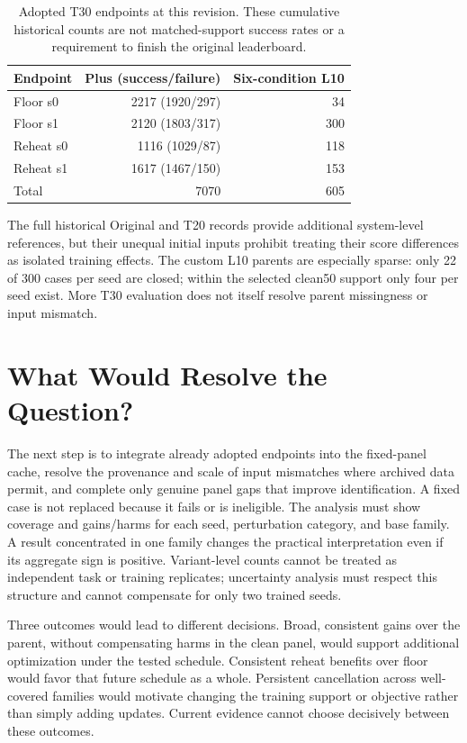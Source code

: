 \documentclass[conference]{IEEEtran}
\begin{document}
\begin{table}[t]
\caption{Adopted T30 endpoints at this revision. These cumulative historical counts are not matched-support success rates or a requirement to finish the original leaderboard.}
\label{tab:coverage}\centering
\begin{tabular}{@{}lrr@{}}
\toprule
Endpoint & Plus (success/failure) & Six-condition L10\\
\midrule
Floor s0 &2217 (1920/297)&34\\
Floor s1 &2120 (1803/317)&300\\
Reheat s0 &1116 (1029/87)&118\\
Reheat s1 &1617 (1467/150)&153\\
\midrule
Total &7070&605\\
\bottomrule
\end{tabular}
\end{table}

The full historical Original and T20 records provide additional system-level references, but their unequal initial inputs prohibit treating their score differences as isolated training effects. The custom L10 parents are especially sparse: only 22 of 300 cases per seed are closed; within the selected clean50 support only four per seed exist. More T30 evaluation does not itself resolve parent missingness or input mismatch.

\section{What Would Resolve the Question?}
The next step is to integrate already adopted endpoints into the fixed-panel cache, resolve the provenance and scale of input mismatches where archived data permit, and complete only genuine panel gaps that improve identification. A fixed case is not replaced because it fails or is ineligible. The analysis must show coverage and gains/harms for each seed, perturbation category, and base family. A result concentrated in one family changes the practical interpretation even if its aggregate sign is positive. Variant-level counts cannot be treated as independent task or training replicates; uncertainty analysis must respect this structure and cannot compensate for only two trained seeds.

Three outcomes would lead to different decisions. Broad, consistent gains over the parent, without compensating harms in the clean panel, would support additional optimization under the tested schedule. Consistent reheat benefits over floor would favor that future schedule as a whole. Persistent cancellation across well-covered families would motivate changing the training support or objective rather than simply adding updates. Current evidence cannot choose decisively between these outcomes.
\end{document}
